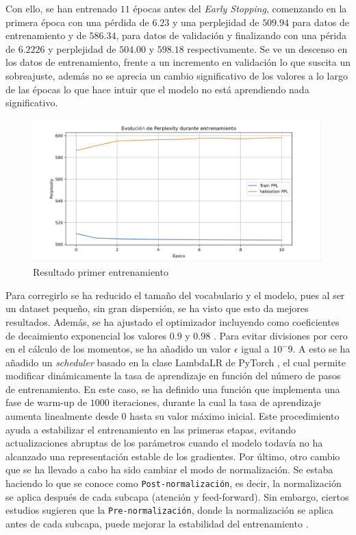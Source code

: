 \documentclass[11pt]{book}
\theoremstyle{plain}
\theoremstyle{definition}
\begin{document}
Con ello, se han entrenado $11$ épocas antes del \textit{Early Stopping}, comenzando en la primera época con una pérdida de $6.23$ y una perplejidad de  $509.94$ para datos de entrenamiento y de $586.34$, para datos de validación y finalizando con una périda de $6.2226$ y perplejidad de $504.00$ y $598.18$ respectivamente. Se ve un descenso en los datos de entrenamiento, frente a un incremento en validación lo que suscita un sobreajuste, además no se aprecia un cambio significativo de los valores a lo largo de las épocas lo que hace intuir que el modelo no está aprendiendo nada significativo.

\begin{figure}[h]
    \centering
    \includegraphics[width=0.5\linewidth]{img/resultado_entrenamiento_v1.png}
    \caption{Resultado primer entrenamiento}
    \label{fig:placeholder24}
\end{figure}

Para corregirlo se ha reducido el tamaño del vocabulario y el modelo, pues al ser un dataset pequeño, sin gran dispersión, se ha visto que esto da mejores resultados. Además, se ha ajustado el optimizador incluyendo como coeficientes de decaimiento exponencial los valores $0.9$ y $0.98$ \parencite{reddit_transformer_not_learning}. Para evitar divisiones por cero en el cálculo de los momentos, se ha añadido un valor $\epsilon$ igual a $10^-9$. A esto se ha añadido un \textit{scheduler} basado en la clase LambdaLR de PyTorch \parencite{pytorch_adjust_lr}, el cual permite modificar dinámicamente la tasa de aprendizaje en función del número de pasos de entrenamiento. En este caso, se ha definido una función que implementa una fase de warm-up de $1000$ iteraciones, durante la cual la tasa de aprendizaje aumenta linealmente desde 0 hasta su valor máximo inicial. Este procedimiento ayuda a estabilizar el entrenamiento en las primeras etapas, evitando actualizaciones abruptas de los parámetros cuando el modelo todavía no ha alcanzado una representación estable de los gradientes. Por último, otro cambio que se ha llevado a cabo ha sido cambiar el modo de normalización. Se estaba haciendo lo que se conoce como \texttt{Post-normalización}, es decir, la normalización se aplica después de cada subcapa (atención y feed-forward). Sin embargo, ciertos estudios sugieren que la \texttt{Pre-normalización}, donde la normalización se aplica antes de cada subcapa, puede mejorar la estabilidad del entrenamiento \parencite{doherty2024_hownot}.
\end{document}
